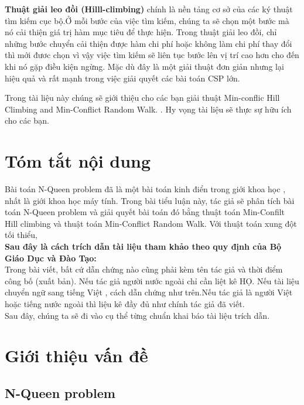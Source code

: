\documentclass{hcmutarticle}
\begin{document}
\textbf{Thuật giải leo đồi (Hilll-climbing)}
 chính là nền tảng cơ sở của các ký thuật tìm kiếm cục bộ.Ở mỗi bước của việc tìm kiếm, chúng ta sẽ chọn một bước mà nó cải thiện giá trị hàm mục tiêu để thực hiện. Trong thuật giải leo đồi, chỉ những bước chuyển cải thiện được hàm chi phí hoặc không làm chi phí thay đổi thì mới đươc chọn vì vậy việc tìm kiếm sẽ liên tục bước lên vị trí cao hơn cho đến khi nó gặp điều kiện ngừng. Mặc dù đây là một giải thuật đơn giản nhưng lại hiệu quả  và rất mạnh trong việc giải quyết các bài toán CSP lớn.



 Trong tài liệu này chúng sẽ giới thiệu cho các bạn giải thuật Min-conflic Hill Climbing and Min-Conflict Random Walk.
. Hy vọng tài liệu sẽ thực sự hữu ích cho các bạn.\\

\newpage

\section{Tóm tắt nội dung}\label{survey}
Bài toán N-Queen problem đã là một bài toán kinh điển trong giới khoa học , nhất là giới khoa học máy tính. Trong bài tiểu luận này, tác giả sẽ phân tích bài toán N-Queen problem và giải quyết bài toán đó bằng thuật toán Min-Confilt Hill climbing và thuật toán Min-Conflict Random Walk.
Với thuật toán xung đột tối thiểu, \\

{\bfseries  Sau đây là cách trích dẫn tài liệu tham khảo theo quy định của Bộ Giáo Dục và Đào Tạo:}\\

Trong bài viết, bất cứ dẫn chứng nào cũng phải kèm tên tác giả và thời điểm công bố (xuất bản). Nếu tác giả người nước ngoài chỉ cần liệt kê HỌ. Nếu tài liệu chuyển ngữ sang tiếng Việt , cách dẫn chứng như trên.Nếu tác giả là người Việt hoặc tiếng nước ngoài thì liệu kê đầy đủ như chính tác giả đã viết.\\
Sau đây, chúng ta sẽ đi vào cụ thể từng chuẩn khai báo tài liệu trích dẫn.
\section{Giới thiệu vấn đề }\label{dev}

\subsection{N-Queen problem}
\end{document}
